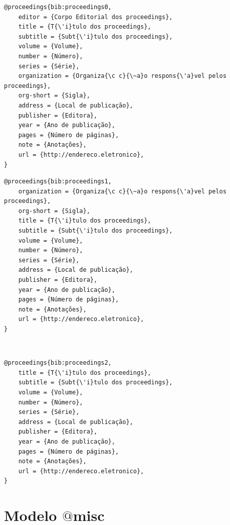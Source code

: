 \documentclass[a4paper,12pt,oneside,onecolumn,final,fleqn]{repUERJ}
\begin{document}
\noindent{}

\begin{verbatim}
@proceedings{bib:proceedings0,
    editor = {Corpo Editorial dos proceedings},
    title = {T{\'i}tulo dos proceedings},
    subtitle = {Subt{\'i}tulo dos proceedings},
    volume = {Volume},
    number = {Número},
    series = {Série},
    organization = {Organiza{\c c}{\~a}o respons{\'a}vel pelos proceedings},
    org-short = {Sigla},
    address = {Local de publicação},
    publisher = {Editora},
    year = {Ano de publicação},
    pages = {Número de páginas},
    note = {Anotações},
    url = {http://endereco.eletronico},
}
\end{verbatim}

\noindent{}

\begin{verbatim}
@proceedings{bib:proceedings1,
    organization = {Organiza{\c c}{\~a}o respons{\'a}vel pelos proceedings},
    org-short = {Sigla},
    title = {T{\'i}tulo dos proceedings},
    subtitle = {Subt{\'i}tulo dos proceedings},
    volume = {Volume},
    number = {Número},
    series = {Série},
    address = {Local de publicação},
    publisher = {Editora},
    year = {Ano de publicação},
    pages = {Número de páginas},
    note = {Anotações},
    url = {http://endereco.eletronico},
}
\end{verbatim}

\noindent{}\\

\begin{verbatim}
@proceedings{bib:proceedings2,
    title = {T{\'i}tulo dos proceedings},
    subtitle = {Subt{\'i}tulo dos proceedings},
    volume = {Volume},
    number = {Número},
    series = {Série},
    address = {Local de publicação},
    publisher = {Editora},
    year = {Ano de publicação},
    pages = {Número de páginas},
    note = {Anotações},
    url = {http://endereco.eletronico},
}
\end{verbatim}

\section{Modelo $@$misc}

\noindent{}
\end{document}
